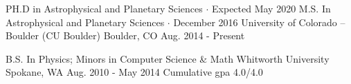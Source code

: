 

\begin{cventries}

  \cventry
    {PH.D in Astrophysical and Planetary Sciences $\cdot$ Expected May 2020 
	\newline
	M.S. In Astrophysical and Planetary Sciences $\cdot$ December 2016} %
    {University of Colorado -- Boulder (CU Boulder)} %
    {Boulder, CO} %
    {Aug. 2014 - Present} %
    {}
    \vspace{-0.15in}

  \cventry
    {B.S. In Physics; Minors in Computer Science \& Math }
    {Whitworth University}
    {Spokane, WA}
    {Aug. 2010 - May 2014}
    {Cumulative gpa 4.0/4.0}
    \vspace{-0.15in}

\end{cventries}
